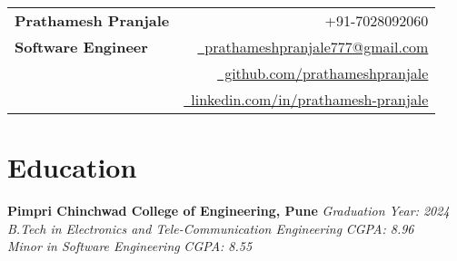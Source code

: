 \documentclass[a4paper,11pt]{article}
\begin{document}
\selectfont

\parbox{\dimexpr\linewidth-0.75cm\relax}{
\begin{tabularx}{\linewidth}{L r}
  \textbf{\Large Prathamesh Pranjale} & \raisebox{0.0\height}{\footnotesize \faPhone} +91-7028092060 \\
  \textbf{\Large Software Engineer} & \href{mailto:prathameshpranjale777@gmail.com}{\raisebox{0.0\height}{\footnotesize \faEnvelope}\ prathameshpranjale777@gmail.com} \\
  & \href{https://github.com/prathameshpranjale}{\raisebox{0.0\height}{\footnotesize \faGithub}\ github.com/prathameshpranjale} \\
  & \href{https://www.linkedin.com/in/prathamesh-pranjale-18929b218/}{\raisebox{0.0\height}{\footnotesize \faLinkedin}\ linkedin.com/in/prathamesh-pranjale}
\end{tabularx}
}


\vspace{-8mm}

\section{\textbf{Education}}
\noindent
\textbf{Pimpri Chinchwad College of Engineering, Pune} \hfill \textit{Graduation Year: 2024} \\
\textit{B.Tech in Electronics and Tele-Communication Engineering} \hfill \textit{CGPA: 8.96} \\
\textit{Minor in Software Engineering} \hfill \textit{CGPA: 8.55} \\
\vspace{-2mm}


\end{document}
